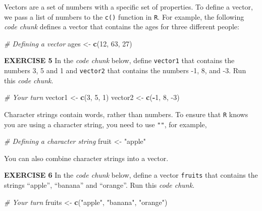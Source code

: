 \documentclass[
]{article}
\newenvironment{Shaded}{\begin{snugshade}}{\end{snugshade}}
\newcommand{\CommentTok}[1]{\textcolor[rgb]{0.56,0.35,0.01}{\textit{#1}}}
\newcommand{\DecValTok}[1]{\textcolor[rgb]{0.00,0.00,0.81}{#1}}
\newcommand{\KeywordTok}[1]{\textcolor[rgb]{0.13,0.29,0.53}{\textbf{#1}}}
\newcommand{\NormalTok}[1]{#1}
\newcommand{\OperatorTok}[1]{\textcolor[rgb]{0.81,0.36,0.00}{\textbf{#1}}}
\newcommand{\StringTok}[1]{\textcolor[rgb]{0.31,0.60,0.02}{#1}}
\begin{document}
Vectors are a set of numbers with a specific set of properties. To
define a vector, we pass a list of numbers to the \texttt{c()} function
in \texttt{R}. For example, the following \emph{code chunk} defines a
vector that contains the ages for three different people:

\begin{Shaded}
\begin{Highlighting}[]
\CommentTok{# Defining a vector}
\NormalTok{ages <-}\StringTok{ }\KeywordTok{c}\NormalTok{(}\DecValTok{12}\NormalTok{, }\DecValTok{63}\NormalTok{, }\DecValTok{27}\NormalTok{)}
\end{Highlighting}
\end{Shaded}

\textbf{EXERCISE 5} In the \emph{code chunk} below, define
\texttt{vector1} that contains the numbers 3, 5 and 1 and
\texttt{vector2} that contains the numbers -1, 8, and -3. Run this
\emph{code chunk}.

\begin{Shaded}
\begin{Highlighting}[]
\CommentTok{# Your turn}
\NormalTok{vector1 <-}\StringTok{ }\KeywordTok{c}\NormalTok{(}\DecValTok{3}\NormalTok{, }\DecValTok{5}\NormalTok{, }\DecValTok{1}\NormalTok{)}
\NormalTok{vector2 <-}\StringTok{ }\KeywordTok{c}\NormalTok{(}\OperatorTok{-}\DecValTok{1}\NormalTok{, }\DecValTok{8}\NormalTok{, }\DecValTok{-3}\NormalTok{)}
\end{Highlighting}
\end{Shaded}

Character strings contain words, rather than numbers. To ensure that
\texttt{R} knows you are using a character string, you need to use
\texttt{""}, for example,

\begin{Shaded}
\begin{Highlighting}[]
\CommentTok{# Defining a character string}
\NormalTok{fruit <-}\StringTok{ "apple"}
\end{Highlighting}
\end{Shaded}

You can also combine character strings into a vector.

\textbf{EXERCISE 6} In the \emph{code chunk} below, define a vector
\texttt{fruits} that contains the strings ``apple'', ``banana'' and
``orange''. Run this \emph{code chunk}.

\begin{Shaded}
\begin{Highlighting}[]
\CommentTok{# Your turn}
\NormalTok{fruits <-}\StringTok{ }\KeywordTok{c}\NormalTok{(}\StringTok{"apple"}\NormalTok{, }\StringTok{"banana"}\NormalTok{, }\StringTok{"orange"}\NormalTok{)}
\end{Highlighting}
\end{Shaded}
\end{document}
